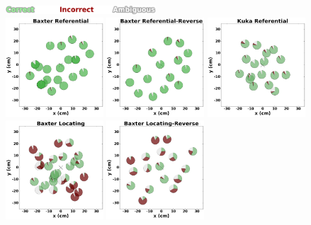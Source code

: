\documentclass[letterpaper]{article} %
\begin{document}
\begin{figure}[ht!]

    \centering
    \includegraphics[width=0.5\textwidth] {labels.png}\\
    \includegraphics[width=0.325\textwidth ] {baxter_Referential_.png}
    \includegraphics[width=0.325\textwidth ] {baxter_Referential-Reverse_.png}
    \includegraphics[width=0.325\textwidth ]{kuka_Referential_.png}
    \includegraphics[width=0.325\textwidth ]{baxter_Locating_.png}
    \includegraphics[width=0.325\textwidth ]{baxter_Locating-Reverse_.png}

\end{figure}
\end{document}
